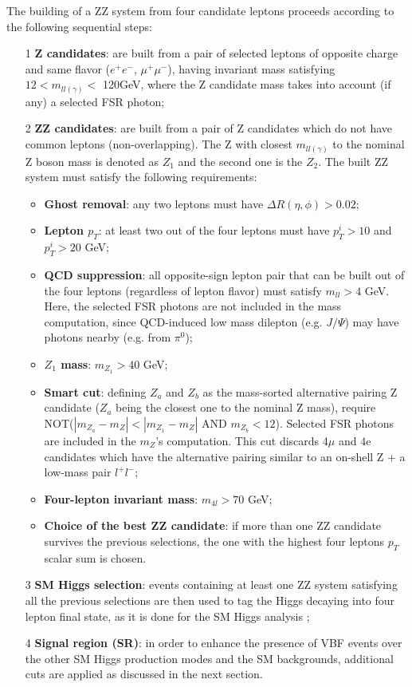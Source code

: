 The building of a ZZ system from four candidate leptons proceeds according to the following sequential steps:
\begin{itemize}
	\item [1] \textbf{Z candidates}: are built from a pair of selected leptons of opposite charge and same flavor ($e^{+}e^{-}$, $\mu^{+}\mu^{-}$), having invariant mass satisfying $12 < m_{ll(\gamma)}<$ 120GeV, where the Z candidate mass takes into account (if any) a selected FSR photon;
	\item [2] \textbf{ZZ candidates}: are built from a pair of Z candidates which do not have common leptons (non-overlapping). The Z with closest $m_{ll(\gamma)}$ to the nominal Z boson mass is denoted as $Z_{1}$ and the second one is the $Z_{2}$. The built ZZ system must satisfy the following requirements:
	\begin{itemize}
		\item \textbf{Ghost removal}: any two leptons must have $\Delta R(\eta,\phi) > 0.02$;
		\item \textbf{Lepton $p_{T}$}: at least two out of the four leptons must have $p^{i}_{T} > 10$ and $p^{i}_{T} > 20$ GeV;
		\item \textbf{QCD suppression}: all opposite-sign lepton pair that can be built out of the four leptons (regardless of lepton flavor) must satisfy $m_{ll} > 4$ GeV. Here, the selected FSR photons are not included in the mass computation, since QCD-induced low mass dilepton (e.g. $J/\Psi$) may have photons nearby (e.g. from $\pi^{0}$);
		\item \textbf{$Z_{1}$ mass}: $m_{Z_{1}} > 40$ GeV;
		\item \textbf{Smart cut}: defining $Z_{a}$ and $Z_{b}$ as the mass-sorted alternative pairing Z candidate ($Z_{a}$ being the closest one to the nominal Z mass), require NOT($|m_{Z_{a}}-m_{Z}| < |m_{Z_{1}}-m_{Z}|$ AND $m_{Z_{b}} < 12$). Selected FSR photons are included in the $m_{Z}$'s computation. This cut discards 4$\mu$ and 4e candidates which have the alternative pairing similar to an on-shell Z + a low-mass pair $l^{+}l^{-}$;
		\item \textbf{Four-lepton invariant mass}: $m_{4l} > 70$ GeV;
		\item \textbf{Choice of the best ZZ candidate}: if more than one ZZ candidate survives the previous selections, the one with the highest four leptons $p_{T}$ scalar sum is chosen.
	\end{itemize}
	\item [3] \textbf{SM Higgs selection}: events containing at least one ZZ system satisfying all the previous selections are then used to tag the Higgs decaying into four lepton final state, as it is done for the SM Higgs analysis \cite{bib:CMS-AN-16-442};
	\item [4] \textbf{Signal region (SR)}: in order to enhance the presence of VBF events over the other SM Higgs production modes and the SM backgrounds, additional cuts are applied as discussed in the next section.
\end{itemize}

